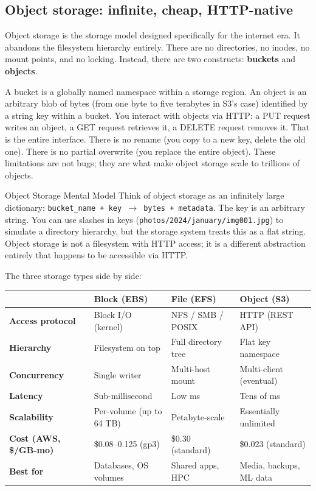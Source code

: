 \documentclass[11pt,a4paper]{article}
\begin{document}
\subsection{Object storage: infinite, cheap, HTTP-native}

Object storage is the storage model designed specifically for the internet era. It abandons the filesystem hierarchy entirely. There are no directories, no inodes, no mount points, and no locking. Instead, there are two constructs: \textbf{buckets} and \textbf{objects}.

A bucket is a globally named namespace within a storage region. An object is an arbitrary blob of bytes (from one byte to five terabytes in S3's case) identified by a string key within a bucket. You interact with objects via HTTP: a PUT request writes an object, a GET request retrieves it, a DELETE request removes it. That is the entire interface. There is no rename (you copy to a new key, delete the old one). There is no partial overwrite (you replace the entire object). These limitations are not bugs; they are what make object storage scale to trillions of objects.

\begin{termbox}{Object Storage Mental Model}
Think of object storage as an infinitely large dictionary: \texttt{bucket\_name + key $\rightarrow$ bytes + metadata}. The key is an arbitrary string. You can use slashes in keys (\texttt{photos/2024/january/img001.jpg}) to simulate a directory hierarchy, but the storage system treats this as a flat string. Object storage is not a filesystem with HTTP access; it is a different abstraction entirely that happens to be accessible via HTTP.
\end{termbox}

The three storage types side by side:

\begin{center}
\renewcommand{\arraystretch}{1.4}
\begin{tabular}{>{\bfseries}p{3.2cm}p{3.4cm}p{3.4cm}p{3.4cm}}
\toprule
 & \textbf{Block (EBS)} & \textbf{File (EFS)} & \textbf{Object (S3)} \\
\midrule
Access protocol & Block I/O (kernel) & NFS / SMB / POSIX & HTTP (REST API) \\
Hierarchy & Filesystem on top & Full directory tree & Flat key namespace \\
Concurrency & Single writer & Multi-host mount & Multi-client (eventual) \\
Latency & Sub-millisecond & Low ms & Tens of ms \\
Scalability & Per-volume (up to 64 TB) & Petabyte-scale & Essentially unlimited \\
Cost (AWS, \$/GB-mo) & \$0.08--0.125 (gp3) & \$0.30 (standard) & \$0.023 (standard) \\
Best for & Databases, OS volumes & Shared apps, HPC & Media, backups, ML data \\
\bottomrule
\end{tabular}
\end{center}
\end{document}
